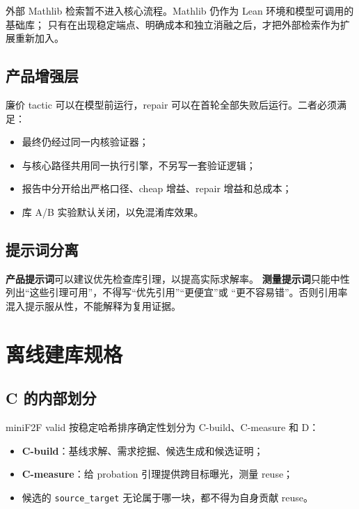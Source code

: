 \documentclass[UTF8,a4paper,11pt,fontset=windows]{ctexart}
\newcommand{\code}[1]{\texttt{\small #1}}
\begin{document}
外部 Mathlib 检索暂不进入核心流程。Mathlib 仍作为 Lean 环境和模型可调用的基础库；
只有在出现稳定端点、明确成本和独立消融之后，才把外部检索作为扩展重新加入。

\subsection{产品增强层}

廉价 tactic 可以在模型前运行，repair 可以在首轮全部失败后运行。二者必须满足：

\begin{itemize}[leftmargin=1.8em,itemsep=3pt]
  \item 最终仍经过同一内核验证器；
  \item 与核心路径共用同一执行引擎，不另写一套验证逻辑；
  \item 报告中分开给出严格口径、cheap 增益、repair 增益和总成本；
  \item 库 A/B 实验默认关闭，以免混淆库效果。
\end{itemize}

\subsection{提示词分离}

\textbf{产品提示词}可以建议优先检查库引理，以提高实际求解率。
\textbf{测量提示词}只能中性列出“这些引理可用”，不得写“优先引用”“更便宜”或
“更不容易错”。否则引用率混入提示服从性，不能解释为复用证据。

\section{离线建库规格}

\subsection{C 的内部划分}

miniF2F valid 按稳定哈希排序确定性划分为 C-build、C-measure 和 D：

\begin{itemize}[leftmargin=1.8em,itemsep=3pt]
  \item \textbf{C-build}：基线求解、需求挖掘、候选生成和候选证明；
  \item \textbf{C-measure}：给 probation 引理提供跨目标曝光，测量 reuse；
  \item 候选的 \code{source\_target} 无论属于哪一块，都不得为自身贡献 reuse。
\end{itemize}
\end{document}

